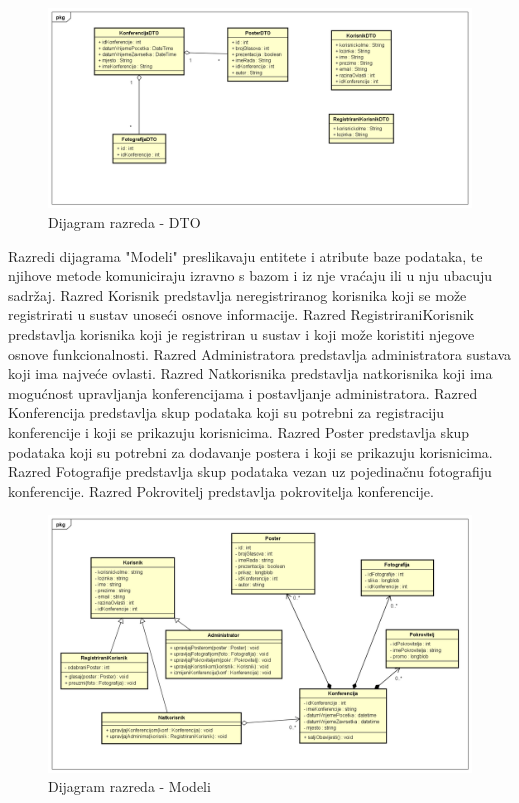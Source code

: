 			\begin{figure} [h]
				\includegraphics[width=\linewidth]{Slike/DarioClassDiagramDTO}
				\caption{Dijagram razreda - DTO}
			\end{figure}
			
			Razredi dijagrama "Modeli" preslikavaju entitete i atribute baze podataka, te njihove metode komuniciraju izravno s bazom i iz nje vraćaju ili u nju ubacuju sadržaj. Razred Korisnik predstavlja neregistriranog korisnika koji se može registrirati u sustav unoseći osnove informacije. Razred RegistriraniKorisnik predstavlja korisnika koji je registriran u sustav i koji može koristiti njegove osnove funkcionalnosti. Razred Administratora predstavlja administratora sustava koji ima najveće ovlasti. Razred Natkorisnika predstavlja natkorisnika koji ima mogućnost upravljanja konferencijama i postavljanje administratora. Razred Konferencija predstavlja skup podataka koji su potrebni za registraciju konferencije i koji se prikazuju korisnicima. Razred Poster predstavlja skup podataka koji su potrebni za dodavanje postera i koji se prikazuju korisnicima. Razred Fotografije predstavlja skup podataka vezan uz pojedinačnu fotografiju konferencije. Razred Pokrovitelj predstavlja pokrovitelja konferencije. 
			
			\begin{figure} [h]
				\includegraphics[width=\linewidth]{Slike/ClassDiagramModels}
				\caption{Dijagram razreda - Modeli}
			\end{figure}
			
